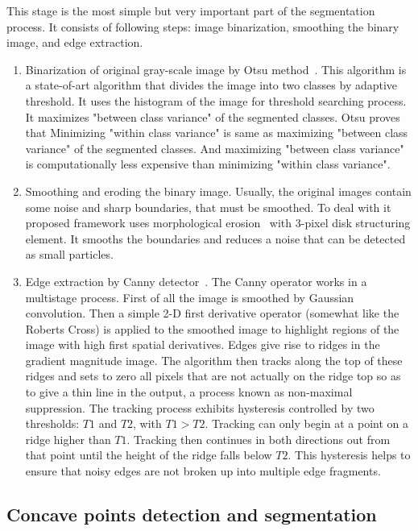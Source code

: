 \documentclass{lutmscthesis}[2010/09/22]
\begin{document}
This stage is the most simple but very important part of the segmentation process. It consists of following steps: image binarization, smoothing the binary image, and edge extraction.

\begin{enumerate}
    \item Binarization of original gray-scale image by Otsu method~\cite{otsu}. This algorithm is a state-of-art algorithm that divides the image into two classes by adaptive threshold. It uses the histogram of the image for threshold searching process. It maximizes "between class variance" of the segmented classes. Otsu proves that Minimizing "within class variance" is same as maximizing "between class variance" of the segmented classes. And maximizing "between class variance" is computationally less expensive than minimizing "within class variance".
    \item Smoothing and eroding the binary image. Usually, the original images contain some noise and sharp boundaries, that must be smoothed. To deal with it proposed framework uses morphological erosion~\cite{UECS} with 3-pixel disk structuring element. It smooths the boundaries and reduces a noise that can be detected as small particles.
    \item Edge extraction by Canny detector~\cite{Canny}. The Canny operator works in a multistage process. First of all the image is smoothed by Gaussian convolution. Then a simple 2-D first derivative operator (somewhat like the Roberts Cross) is applied to the smoothed image to highlight regions of the image with high first spatial derivatives. Edges give rise to ridges in the gradient magnitude image. The algorithm then tracks along the top of these ridges and sets to zero all pixels that are not actually on the ridge top so as to give a thin line in the output, a process known as non-maximal suppression. The tracking process exhibits hysteresis controlled by two thresholds: $T1$ and $T2$, with $T1 > T2$. Tracking can only begin at a point on a ridge higher than $T1$. Tracking then continues in both directions out from that point until the height of the ridge falls below $T2$. This hysteresis helps to ensure that noisy edges are not broken up into multiple edge fragments.
\end{enumerate}

\subsection{Concave points detection and segmentation}
\end{document}
